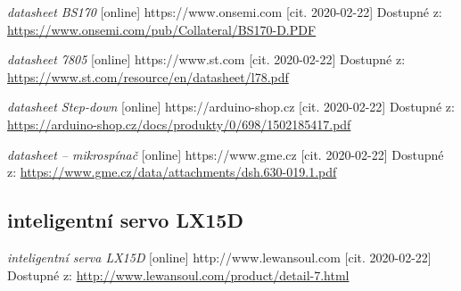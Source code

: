\documentclass{template/socthesis}
\begin{document}
\begin{thebibliography}{1}
			\textit{datasheet BS170} [online] https://www.onsemi.com [cit. 2020-02-22] Dostupné z:
			\url{https://www.onsemi.com/pub/Collateral/BS170-D.PDF}
			
			
			\textit{datasheet 7805} [online] https://www.st.com [cit. 2020-02-22] Dostupné z:
			\url{https://www.st.com/resource/en/datasheet/l78.pdf}
			
			
			\textit{datasheet Step-down} [online] https://arduino-shop.cz [cit. 2020-02-22] Dostupné z:
			\url{https://arduino-shop.cz/docs/produkty/0/698/1502185417.pdf}
			
			
			\textit{datasheet -- mikrospínač} [online] https://www.gme.cz [cit. 2020-02-22] Dostupné z:
			\url{https://www.gme.cz/data/attachments/dsh.630-019.1.pdf}
			
			\subsection*{inteligentní servo LX15D}
			
			\textit{inteligentní serva LX15D} [online] http://www.lewansoul.com [cit. 2020-02-22] Dostupné z:
			\url{http://www.lewansoul.com/product/detail-7.html}
			
		\end{thebibliography}
\end{document}

